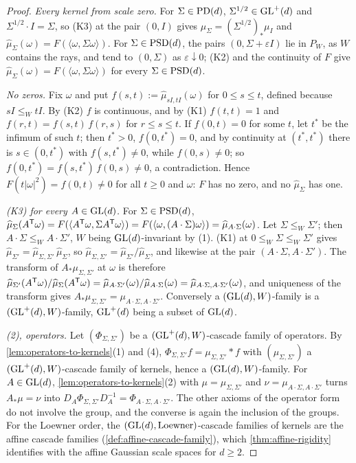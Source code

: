 \begin{proof}
\emph{Every kernel from scale zero.} For $\Sigma \in \mathrm{PD}(d)$, $\Sigma^{1/2} \in \mathrm{GL}^+(d)$ and
$\Sigma^{1/2} \cdot I = \Sigma$, so (K3) at the pair $(0, I)$ gives $\mu_\Sigma = (\Sigma^{1/2})_*\mu_I$
and $\widehat\mu_\Sigma(\omega) = F(\langle\omega,\Sigma\omega\rangle)$. For $\Sigma \in \mathrm{PSD}(d)$, the
pairs $(0, \Sigma + \varepsilon I)$ lie in $P_W$, as $W$ contains the rays, and tend to $(0, \Sigma)$ as
$\varepsilon \downarrow 0$; (K2) and the continuity of $F$ give
$\widehat\mu_\Sigma(\omega) = F(\langle\omega,\Sigma\omega\rangle)$ for every $\Sigma \in \mathrm{PSD}(d)$.

\emph{No zeros.} Fix $\omega$ and put $f(s,t) := \widehat\mu_{sI,tI}(\omega)$ for $0 \le s \le t$, defined
because $sI \le_W tI$. By (K2) $f$ is continuous, and by (K1) $f(t,t) = 1$ and
$f(r,t) = f(s,t)\,f(r,s)$ for $r \le s \le t$. If $f(0,t) = 0$ for some $t$, let $t^*$ be the infimum of
such $t$; then $t^* > 0$, $f(0,t^*) = 0$, and by continuity at $(t^*,t^*)$ there is $s \in (0,t^*)$ with
$f(s,t^*) \ne 0$, while $f(0,s) \ne 0$; so $f(0,t^*) = f(s,t^*)\,f(0,s) \ne 0$, a contradiction. Hence
$F(t|\omega|^2) = f(0,t) \ne 0$ for all $t \ge 0$ and $\omega$: $F$ has no zero, and no
$\widehat\mu_\Sigma$ has one.

\emph{(K3) for every $A \in \mathrm{GL}(d)$.} For $\Sigma \in \mathrm{PSD}(d)$,
$\widehat\mu_\Sigma(A^{\mathsf{T}}\omega) = F(\langle A^{\mathsf{T}}\omega,\Sigma A^{\mathsf{T}}\omega\rangle)
= F(\langle\omega,(A\cdot\Sigma)\omega\rangle) = \widehat\mu_{A\cdot\Sigma}(\omega)$. Let
$\Sigma \le_W \Sigma'$; then $A\cdot\Sigma \le_W A\cdot\Sigma'$, $W$ being $\mathrm{GL}(d)$-invariant by (1).
(K1) at $0 \le_W \Sigma \le_W \Sigma'$ gives $\widehat\mu_{\Sigma'} = \widehat\mu_{\Sigma,\Sigma'}\,
\widehat\mu_\Sigma$, so $\widehat\mu_{\Sigma,\Sigma'} = \widehat\mu_{\Sigma'}/\widehat\mu_\Sigma$, and
likewise at the pair $(A\cdot\Sigma, A\cdot\Sigma')$. The transform of $A_*\mu_{\Sigma,\Sigma'}$ at
$\omega$ is therefore $\widehat\mu_{\Sigma'}(A^{\mathsf{T}}\omega)/\widehat\mu_\Sigma(A^{\mathsf{T}}\omega) =
\widehat\mu_{A\cdot\Sigma'}(\omega)/\widehat\mu_{A\cdot\Sigma}(\omega) =
\widehat\mu_{A\cdot\Sigma,A\cdot\Sigma'}(\omega)$, and uniqueness of the transform gives
$A_*\mu_{\Sigma,\Sigma'} = \mu_{A\cdot\Sigma,A\cdot\Sigma'}$. Conversely a $(\mathrm{GL}(d), W)$-family is a
$(\mathrm{GL}^+(d), W)$-family, $\mathrm{GL}^+(d)$ being a subset of $\mathrm{GL}(d)$.

\emph{(2), operators.} Let $(\Phi_{\Sigma,\Sigma'})$ be a $(\mathrm{GL}^+(d), W)$-cascade family of operators.
By \ref{lem:operators-to-kernels}(1) and (4), $\Phi_{\Sigma,\Sigma'}f = \mu_{\Sigma,\Sigma'} * f$ with
$(\mu_{\Sigma,\Sigma'})$ a $(\mathrm{GL}^+(d), W)$-cascade family of kernels, hence a $(\mathrm{GL}(d), W)$-family. For
$A \in \mathrm{GL}(d)$, \ref{lem:operators-to-kernels}(2) with $\mu = \mu_{\Sigma,\Sigma'}$ and
$\nu = \mu_{A\cdot\Sigma,A\cdot\Sigma'}$ turns $A_*\mu = \nu$ into
$D_A\Phi_{\Sigma,\Sigma'}D_A^{-1} = \Phi_{A\cdot\Sigma,A\cdot\Sigma'}$. The other axioms of the operator
form do not involve the group, and the converse is again the inclusion of the groups. For the
Loewner order, the $(\mathrm{GL}(d), \text{Loewner})$-cascade families of kernels are the affine cascade
families (\ref{def:affine-cascade-family}), which \ref{thm:affine-rigidity} identifies with the affine
Gaussian scale spaces for $d \ge 2$.


\end{proof}
